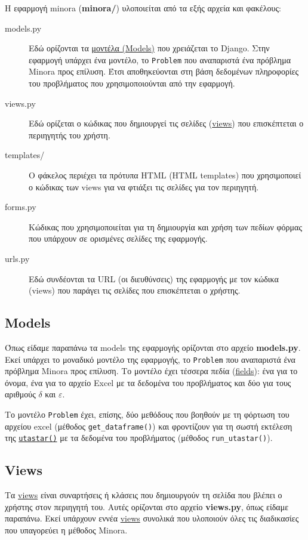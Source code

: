 \documentclass[11pt,a4paper,titlepage]{article}
\numberwithin{equation}{section}
\begin{document}
Η εφαρμογή minora (\textbf{minora/}) υλοποιείται από τα εξής αρχεία και φακέλους:
\begin{description}
\item[models.py] Εδώ ορίζονται τα \href{https://docs.djangoproject.com/en/3.2/topics/db/models/}{μοντέλα (Models)} που χρειάζεται το Django. Στην εφαρμογή υπάρχει ένα μοντέλο, το \texttt{Problem} που αναπαριστά ένα πρόβλημα Minora προς επίλυση. Έτσι αποθηκεύονται στη βάση δεδομένων πληροφορίες του προβλήματος που χρησιμοποιούνται από την εφαρμογή.
\item[views.py] Εδώ ορίζεται ο κώδικας που δημιουργεί τις σελίδες (\href{https://docs.djangoproject.com/en/3.2/topics/http/views/}{views}) που επισκέπτεται ο περιηγητής του χρήστη.
\item[templates/] Ο φάκελος περιέχει τα πρότυπα HTML (HTML templates) που χρησιμοποιεί ο κώδικας των views για να φτιάξει τις σελίδες για τον περιηγητή.
\item[forms.py] Κώδικας που χρησιμοποιείται για τη δημιουργία και χρήση των πεδίων φόρμας που υπάρχουν σε ορισμένες σελίδες της εφαρμογής.
\item[urls.py] Εδώ συνδέονται τα URL (οι διευθύνσεις) της εφαρμογής με τον κώδικα (views) που παράγει τις σελίδες που επισκέπτεται ο χρήστης.
\end{description}

\subsection{Models}
\label{ssec:models}
Όπως είδαμε παραπάνω τα models της εφαρμογής ορίζονται στο αρχείο \textbf{models.py}. Εκεί υπάρχει το μοναδικό 
μοντέλο της εφαρμογής, το \texttt{Problem} που αναπαριστά ένα πρόβλημα Minora προς επίλυση. Το μοντέλο έχει τέσσερα πεδία (\href{https://docs.djangoproject.com/en/3.2/ref/models/fields/}{fields}): ένα για το όνομα, ένα για το αρχείο Excel με τα δεδομένα του προβλήματος και δύο για τους αριθμούς $ \delta $ και $ \varepsilon $.

Το μοντέλο \texttt{Problem} έχει, επίσης, δύο μεθόδους που βοηθούν με τη φόρτωση του αρχείου excel (μέθοδος \texttt{get\_dataframe()}) και φροντίζουν για τη σωστή εκτέλεση της \hyperref[sssec:utastar()]{\texttt{utastar()}} με τα δεδομένα του προβλήματος (μέθοδος \texttt{run\_utastar()}).

\subsection{Views}
\label{ssec:views}
Τα \href{https://docs.djangoproject.com/en/3.2/topics/http/views/}{views} είναι συναρτήσεις ή κλάσεις που δημιουργούν τη σελίδα που βλέπει ο χρήστης στον περιηγητή του. Αυτές ορίζονται στο αρχείο \textbf{views.py}, όπως είδαμε παραπάνω. Εκεί υπάρχουν εννέα \href{https://docs.djangoproject.com/en/3.2/topics/http/views/}{views} συνολικά που υλοποιούν όλες τις διαδικασίες που υπαγορεύει η μέθοδος Minora.
\end{document}

